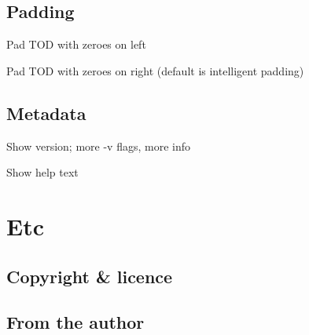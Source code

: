 \documentclass[a4paper,12pt,oneside,openany]{memoir}
\begin{document}
\section{Padding}

\begin{description}[format=\ttfamily]
  \item[--lpad]
  Pad TOD with zeroes on left
  \item[--rpad]
  Pad TOD with zeroes on right
  (default is intelligent padding)
\end{description}

\section{Metadata}

\begin{description}[format=\ttfamily]
  \item[-v,--version]
    Show version;
    more -v flags, more info
  \item[-h,--help]
    Show help text
\end{description}

\chapter{Etc}
\clearpage

\clearpage
\section{Copyright \& licence}
\section{From the author}
\clearpage
\raggedright
\printpagenotes
\end{document}
